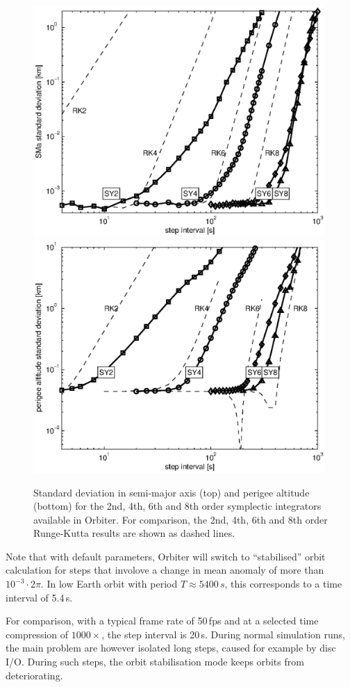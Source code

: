 \documentclass[Orbiter Technical Reference.tex]{subfiles}
\begin{document}
\begin{figure}[H]\centering
\includegraphics[width=0.99\textwidth]{sma_symp_std}
\includegraphics[width=0.99\textwidth]{pea_symp_std}
\caption{Standard deviation in semi-major axis (top) and perigee altitude (bottom) for the 2nd, 4th, 6th and 8th order symplectic integrators available in Orbiter. For comparison, the 2nd, 4th, 6th and 8th order Runge-Kutta results are shown as dashed lines.}
\label{fig:symp_err}
\end{figure}

Note that with default parameters, Orbiter will switch to ``stabilised'' orbit calculation for steps that involove a change in mean anomaly of more than $10^{-3} \cdot 2\pi$. In low Earth orbit with period $T\approx5400\,s$, this corresponds to a time interval of 5.4\,s.

For comparison, with a typical frame rate of 50\,fps and at a selected time compression of $1000\times$, the step interval is 20\,s. During normal simulation runs, the main problem are however isolated long steps, caused for example by disc I/O. During such steps, the orbit stabilisation mode keeps orbits from deteriorating. 
\end{document}
